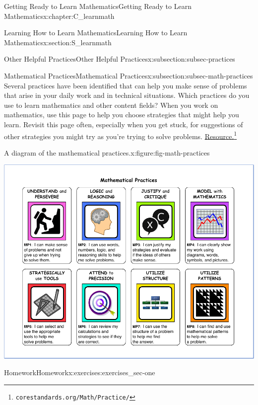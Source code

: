 \documentclass[oneside,10pt,]{book}
\numberwithin{equation}{chapter}
\begin{document}
\begin{chapterptx}{Getting Ready to Learn Mathematics}{}{Getting Ready to Learn Mathematics}{}{}{x:chapter:C_learnmath}
\begin{sectionptx}{Learning How to Learn Mathematics}{}{Learning How to Learn Mathematics}{}{}{x:section:S_learnmath}
\begin{subsectionptx}{Other Helpful Practices}{}{Other Helpful Practices}{}{}{x:subsection:subsec-practices}
\end{subsectionptx}
%
%
\typeout{************************************************}
\typeout{************************************************}
%
\begin{subsectionptx}{Mathematical Practices}{}{Mathematical Practices}{}{}{x:subsection:subsec-math-practices}
Several practices have been identified that can help you make sense of problems that arise in your daily work and in technical situations. Which practices do you use to learn mathematics and other content fields? When you work on mathematics, use this page to help you choose strategies that might help you learn. Revisit this page often, especially when you get stuck, for suggestions of other strategies you might try as you're trying to solve problems. \href{http://www.corestandards.org/Math/Practice/}{Resource.}\footnote{\nolinkurl{corestandards.org/Math/Practice/}\label{g:fn:idp1871477880}}%
\begin{figureptx}{A diagram of the mathematical practices.}{x:figure:fig-math-practices}{}%
\begin{image}{0}{1}{0}%
\includegraphics[width=\linewidth]{external/math-practices.pdf}
\end{image}%
\tcblower
\end{figureptx}%
\end{subsectionptx}
%
%
\typeout{************************************************}
\typeout{************************************************}
%
\begin{exercises-subsection}{Homework}{}{Homework}{}{}{x:exercises:exercises_sec-one}

\end{exercises-subsection}
\end{sectionptx}
\end{chapterptx}
\end{document}
